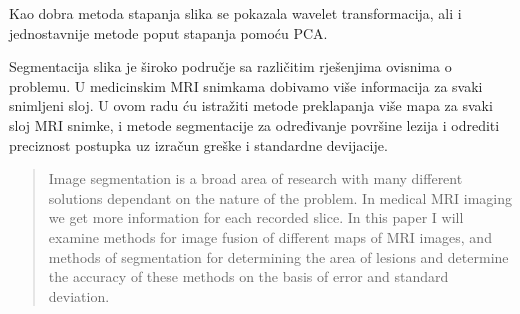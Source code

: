 \documentclass[lmodern, utf8, seminar]{fer}
\begin{document}
Kao dobra metoda stapanja slika se pokazala wavelet transformacija, ali i jednostavnije metode poput stapanja pomoću PCA. 




\begin{sazetak}
	Segmentacija slika je široko područje sa različitim rješenjima ovisnima o problemu. U medicinskim MRI snimkama dobivamo više informacija za svaki snimljeni sloj. U ovom radu ću istražiti metode preklapanja više mapa za svaki sloj MRI snimke, i metode segmentacije za određivanje površine lezija i odrediti preciznost postupka uz izračun greške i standardne devijacije.

\end{sazetak}

\begin{abstract}
	Image segmentation is a broad area of research with many different solutions dependant on the nature of the problem. In medical MRI imaging we get more information for each recorded slice. In this paper I will examine methods for image fusion of different maps of MRI images, and methods of segmentation for determining the area of lesions and determine the accuracy of these methods on the basis of error and standard deviation.

\end{abstract}
\end{document}
